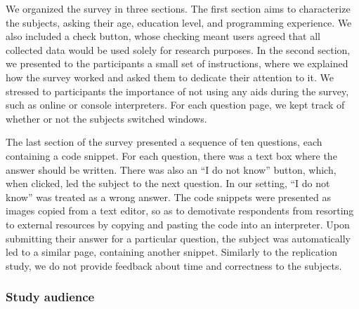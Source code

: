 We organized the survey in three sections. The first section aims to characterize the subjects, asking their age, education level, and programming experience. We also included a check button, whose checking meant users agreed that all collected data would be used solely for research purposes. In the second section, we presented to the participants a small set of instructions, where we explained how the survey worked and asked them to dedicate their attention to it. We stressed to participants the importance of not using any aids during the survey, such as online or console interpreters. For each question page, we kept track of whether or not the subjects switched windows. 

The last section of the survey presented a sequence of ten questions, each containing a code snippet. For each question, there was a text box where the answer should be written. There was also an ``I do not know'' button, which, when clicked, led the subject to the next question. In our setting, ``I do not know'' was treated as a wrong answer. The code snippets were presented as images copied from a text editor, so as to demotivate respondents from resorting to external resources by copying and pasting the code into an interpreter. Upon submitting their answer for a particular question, the subject was automatically led to a similar page, containing another snippet. Similarly to the replication study, we do not provide feedback about time and correctness to the subjects.




\subsubsection*{Study audience}

